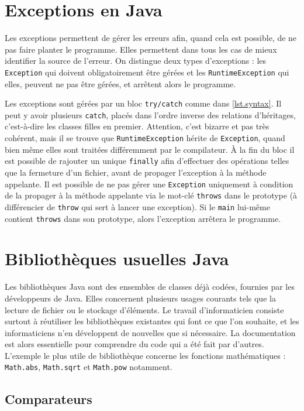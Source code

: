 \documentclass[10pt]{article}
\begin{document}
\section{Exceptions en Java}

Les exceptions permettent de gérer les erreurs afin, quand cela est possible, de ne pas faire
planter le programme. Elles permettent dans tous les cas de mieux identifier la source de l'erreur.
On distingue deux types d'exceptions : les \texttt{Exception} qui doivent obligatoirement être gérées
et les \texttt{RuntimeException} qui elles, peuvent ne pas être gérées, et arrêtent alors le programme.

Les exceptions sont gérées par un bloc \texttt{try/catch} comme dans \cref{lst.syntax}. Il peut y avoir
plusieurs \texttt{catch}, placés dans l'ordre inverse des relations d'héritages, c'est-à-dire les classes
filles en premier. Attention, c'est bizarre et pas très cohérent, mais il se trouve que \texttt{RuntimeException}
hérite de \texttt{Exception}, quand bien même elles sont traitées différemment par le compilateur. À la fin
du bloc il est possible de rajouter un unique \texttt{finally} afin d'effectuer des opérations telles que la fermeture
d'un fichier, avant de propager l'exception à la méthode appelante. Il est possible de ne pas gérer une \texttt{Exception}
uniquement à condition de la propager à la méthode appelante via le mot-clé \texttt{throws} dans le prototype (à différencier
de \texttt{throw} qui sert à lancer une exception). Si le \texttt{main} lui-même contient \texttt{throws} dans son prototype,
alors l'exception arrêtera le programme.


\section{Bibliothèques usuelles Java}


Les bibliothèques Java sont des ensembles de classes déjà codées, fournies par les développeurs de Java. Elles concernent
plusieurs usages courants tels que la lecture de fichier ou le stockage d'éléments. Le travail d'informaticien consiste
surtout à réutiliser les bibliothèques existantes qui font ce que l'on souhaite, et les informaticiens n'en développent
de nouvelles que si nécessaire. La documentation est alors essentielle pour comprendre du code qui a été fait par d'autres.
L'exemple le plus utile de bibliothèque concerne les fonctions mathématiques : \texttt{Math.abs}, \texttt{Math.sqrt}
et \texttt{Math.pow} notamment.


\subsection{Comparateurs}
\end{document}
